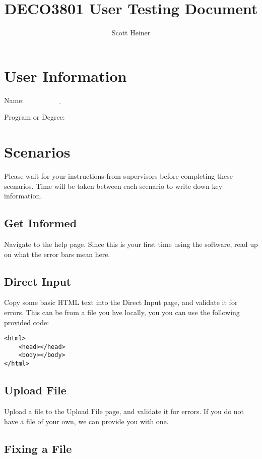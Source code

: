 \documentclass[11pt]{article}
\title{\bf DECO3801 User Testing Document}
\author{Scott Heiner}
\date{}
\begin{document}
\maketitle

\section*{User Information}

Name: $\underline{\hspace{4cm}}$

Program or Degree: $\underline{\hspace{5cm}}$

\section*{Scenarios}

Please wait for your instructions from supervisors before completing these scenarios. Time will be taken between each scenario to write down key information.

\subsection*{Get Informed}

Navigate to the help page. Since this is your first time using the software, read up on what the error bars mean here.

\subsection*{Direct Input}

Copy some basic HTML text into the Direct Input page, and validate it for errors. This can be from a file you hve locally, you you can use the following provided code:

\begin{verbatim}
<html>
	<head></head>
	<body></body>
</html>
\end{verbatim}

\subsection*{Upload File}

Upload a file to the Upload File page, and validate it for errors. If you do not have a file of your own, we can provide you with one.

\subsection*{Fixing a File}
\end{document}
